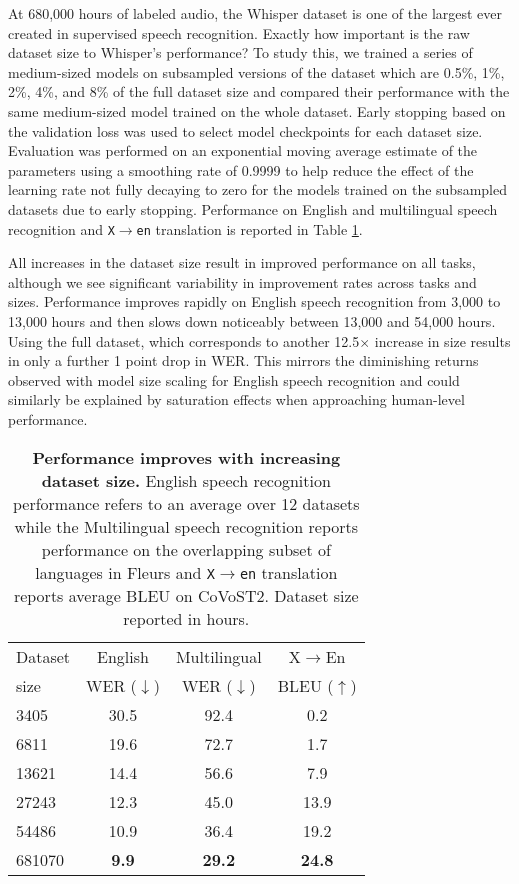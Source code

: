 At 680,000 hours of labeled audio, the Whisper dataset is one of the largest ever created in supervised speech recognition. Exactly how important is the raw dataset size to Whisper's performance? To study this, we trained a series of medium-sized models on subsampled versions of the dataset which are 0.5\%, 1\%, 2\%, 4\%, and 8\% of the full dataset size and compared their performance with the same medium-sized model trained on the whole dataset. Early stopping based on the validation loss was used to select model checkpoints for each dataset size. Evaluation was performed on an exponential moving average estimate of the parameters \cite{polyak1992acceleration} using a smoothing rate of 0.9999 to help reduce the effect of the learning rate not fully decaying to zero for the models trained on the subsampled datasets due to early stopping. Performance on English and multilingual speech recognition and \texttt{X$\rightarrow$en} translation is reported in Table \ref{dataset_scaling_table}.

All increases in the dataset size result in improved performance on all tasks, although we see significant variability in improvement rates across tasks and sizes. Performance improves rapidly on English speech recognition from 3,000 to 13,000 hours and then slows down noticeably between 13,000 and 54,000 hours. Using the full dataset, which corresponds to another 12.5$\times$ increase in size results in only a further 1 point drop in WER. This mirrors the diminishing returns observed with model size scaling for English speech recognition and could similarly be explained by saturation effects when approaching human-level performance.

\begin{table}[t]
\vskip 0.15in
\begin{center}
\begin{tabular}{l|ccc}
\toprule
 Dataset & English & Multilingual & X$\rightarrow$En \\
 size & WER ($\downarrow$) & WER ($\downarrow$) & BLEU ($\uparrow$) \\
\midrule
3405 & 30.5 & 92.4 & 0.2 \\
6811 & 19.6 & 72.7 & 1.7 \\
13621 & 14.4 & 56.6 & 7.9 \\
27243 & 12.3 & 45.0 & 13.9 \\
54486 & 10.9 & 36.4 & 19.2 \\
681070 & \textbf{9.9} & \textbf{29.2} & \textbf{24.8} \\
\bottomrule
\end{tabular}
\caption{\textbf{Performance improves with increasing dataset size. } English speech recognition performance refers to an average over 12 datasets while the Multilingual speech recognition reports performance on the overlapping subset of languages in Fleurs and \texttt{X$\rightarrow$en} translation reports average BLEU on CoVoST2. Dataset size reported in hours.}
\label{dataset_scaling_table}
\end{center}
\vspace{-1em}
\end{table}


